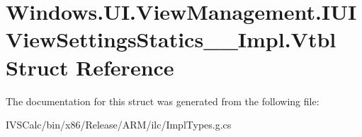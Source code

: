 \hypertarget{struct_windows_1_1_u_i_1_1_view_management_1_1_i_u_i_view_settings_statics_____impl_1_1_vtbl}{}\section{Windows.\+U\+I.\+View\+Management.\+I\+U\+I\+View\+Settings\+Statics\+\_\+\+\_\+\+Impl.\+Vtbl Struct Reference}
\label{struct_windows_1_1_u_i_1_1_view_management_1_1_i_u_i_view_settings_statics_____impl_1_1_vtbl}


The documentation for this struct was generated from the following file\+:\begin{DoxyCompactItemize}
\item 
I\+V\+S\+Calc/bin/x86/\+Release/\+A\+R\+M/ilc/Impl\+Types.\+g.\+cs\end{DoxyCompactItemize}
